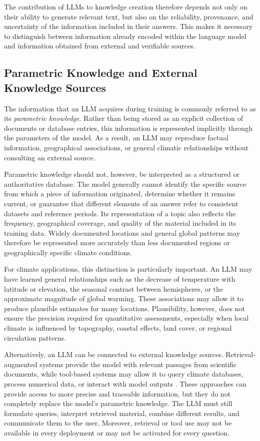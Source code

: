 The contribution of LLMs to knowledge creation therefore depends not only on their ability to generate relevant text, but also on the reliability, provenance, and uncertainty of the information included in their answers. This makes it necessary to distinguish between information already encoded within the language model and information obtained from external and verifiable sources.


\subsection{Parametric Knowledge and External Knowledge Sources}

The information that an LLM acquires during training is commonly referred to as its \emph{parametric knowledge}. Rather than being stored as an explicit collection of documents or database entries, this information is represented implicitly through the parameters of the model. As a result, an LLM may reproduce factual information, geographical associations, or general climatic relationships without consulting an external source.

Parametric knowledge should not, however, be interpreted as a structured or authoritative database. The model generally cannot identify the specific source from which a piece of information originated, determine whether it remains current, or guarantee that different elements of an answer refer to consistent datasets and reference periods. Its representation of a topic also reflects the frequency, geographical coverage, and quality of the material included in its training data. Widely documented locations and general global patterns may therefore be represented more accurately than less documented regions or geographically specific climate conditions.

For climate applications, this distinction is particularly important. An LLM may have learned general relationships such as the decrease of temperature with latitude or elevation, the seasonal contrast between hemispheres, or the approximate magnitude of global warming. These associations may allow it to produce plausible estimates for many locations. Plausibility, however, does not ensure the precision required for quantitative assessments, especially when local climate is influenced by topography, coastal effects, land cover, or regional circulation patterns.

Alternatively, an LLM can be connected to external knowledge sources. Retrieval-augmented systems provide the model with relevant passages from scientific documents, while tool-based systems may allow it to query climate databases, process numerical data, or interact with model outputs \citep{lewis_retrieval-augmented_2020}. These approaches can provide access to more precise and traceable information, but they do not completely replace the model's parametric knowledge. The LLM must still formulate queries, interpret retrieved material, combine different results, and communicate them to the user. Moreover, retrieval or tool use may not be available in every deployment or may not be activated for every question.

